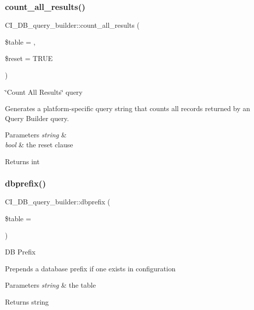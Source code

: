 \subsubsection{\texorpdfstring{count\+\_\+all\+\_\+results()}{count\_all\_results()}}
{\footnotesize\ttfamily C\+I\+\_\+\+D\+B\+\_\+query\+\_\+builder\+::count\+\_\+all\+\_\+results (\begin{DoxyParamCaption}\item[{}]{\$table = {\ttfamily \textquotesingle{}\textquotesingle{}},  }\item[{}]{\$reset = {\ttfamily TRUE} }\end{DoxyParamCaption})}

\char`\"{}\+Count All Results\char`\"{} query

Generates a platform-\/specific query string that counts all records returned by an Query Builder query.


\begin{DoxyParams}{Parameters}
{\em string} & \\
\hline
{\em bool} & the reset clause \\
\hline
\end{DoxyParams}
\begin{DoxyReturn}{Returns}
int 
\end{DoxyReturn}
\mbox{\label{class_c_i___d_b__query__builder_a1aa759780db324df59e77a0a7ebbd821}} 
\subsubsection{\texorpdfstring{dbprefix()}{dbprefix()}}
{\footnotesize\ttfamily C\+I\+\_\+\+D\+B\+\_\+query\+\_\+builder\+::dbprefix (\begin{DoxyParamCaption}\item[{}]{\$table = {\ttfamily \textquotesingle{}\textquotesingle{}} }\end{DoxyParamCaption})}

DB Prefix

Prepends a database prefix if one exists in configuration


\begin{DoxyParams}{Parameters}
{\em string} & the table \\
\hline
\end{DoxyParams}
\begin{DoxyReturn}{Returns}
string 
\end{DoxyReturn}
\mbox{\label{class_c_i___d_b__query__builder_a3e4caf438a69a05c96adedb2cb050d5f}} 
